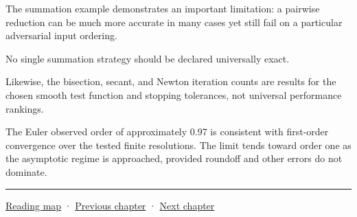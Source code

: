 The summation example demonstrates an important limitation: a pairwise reduction can be much more accurate in many cases yet still fail on a particular adversarial input ordering.

No single summation strategy should be declared universally exact.

Likewise, the bisection, secant, and Newton iteration counts are results for the chosen smooth test function and stopping tolerances, not universal performance rankings.

The Euler observed order of approximately 0.97 is consistent with first-order convergence over the tested finite resolutions. The limit tends toward order one as the asymptotic regime is approached, provided roundoff and other errors do not dominate.

\begin{center}\rule{0.5\linewidth}{0.5pt}\end{center}

\hyperref[volume-reading-map]{Reading map} · \hyperref[02-foundations-ii-ch030]{Previous chapter} · \hyperref[02-foundations-ii-ch032]{Next chapter}
